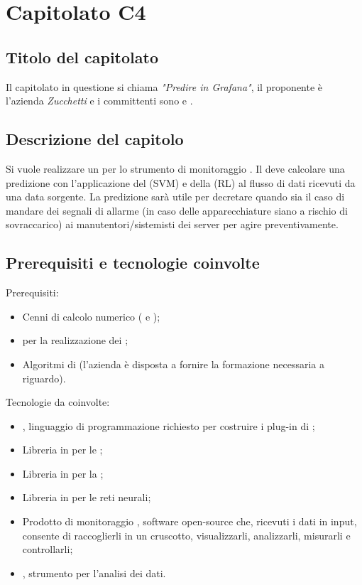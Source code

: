 \section{Capitolato C4}
\subsection{Titolo del capitolato}
Il capitolato in questione si chiama \textit{"Predire in Grafana"}, il proponente è l'azienda \textit{Zucchetti} e i committenti sono \VT{} e \CR{}.

\subsection{Descrizione del capitolo}
Si vuole realizzare un  per lo strumento di monitoraggio . Il  deve calcolare una predizione con l'applicazione del  (SVM) e della  (RL) al flusso di dati ricevuti da una data sorgente. La predizione sarà utile per decretare quando sia il caso di mandare dei segnali di allarme (in caso delle apparecchiature siano a rischio di sovraccarico) ai manutentori/sistemisti dei server per agire preventivamente.

\subsection{Prerequisiti e tecnologie coinvolte}
Prerequisiti:
\begin{itemize}
\item Cenni di calcolo numerico ( e );
\item {} per la realizzazione dei ;
\item Algoritmi di  (l'azienda \`e disposta a fornire la formazione necessaria a riguardo).
\end{itemize}
Tecnologie da coinvolte:
\begin{itemize}
\item {}, linguaggio di programmazione richiesto per costruire i plug-in di  ;
\item Libreria in  per le ;
\item Libreria in  per la ;
\item Libreria in  per le reti neurali;
\item Prodotto di monitoraggio , software open-source che, ricevuti i dati in input, consente di raccoglierli in un cruscotto, visualizzarli, analizzarli, misurarli e controllarli;
\item {}, strumento per l'analisi dei dati.
\end{itemize}


